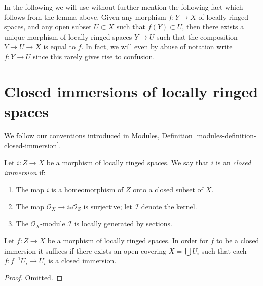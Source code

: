 \noindent
In the following we will use without further mention the following
fact which follows from the lemma above. Given any morphism
$f : Y \to X$ of locally ringed spaces, and any open subset
$U \subset X$ such that $f(Y) \subset U$, then there exists
a unique morphism of locally ringed spaces $Y \to U$ such that
the composition $Y \to U \to X$ is equal to $f$. In fact, we will
even by abuse of notation write $f : Y \to U$ since this rarely
gives rise to confusion.









\section{Closed immersions of locally ringed spaces}
\label{section-closed-immersion}

\noindent
We follow our conventions introduced in
Modules, Definition \ref{modules-definition-closed-immersion}.

\begin{definition}
\label{definition-closed-immersion-locally-ringed-spaces}
Let $i : Z \to X$ be a morphism of locally ringed spaces.
We say that $i$ is an {\it closed immersion} if:
\begin{enumerate}
\item The map $i$ is a homeomorphism of $Z$ onto a closed subset of $X$.
\item The map $\mathcal{O}_X \to i_*\mathcal{O}_Z$ is surjective;
let $\mathcal{I}$ denote the kernel.
\item The $\mathcal{O}_X$-module $\mathcal{I}$
is locally generated by sections.
\end{enumerate}
\end{definition}

\begin{lemma}
\label{lemma-closed-local-target}
Let $f : Z \to X$ be a morphism of locally ringed spaces.
In order for $f$ to be a closed immersion it suffices
if there exists an open covering $X = \bigcup U_i$ such
that each $f : f^{-1}U_i \to U_i$ is a closed immersion.
\end{lemma}

\begin{proof}
Omitted.
\end{proof}

